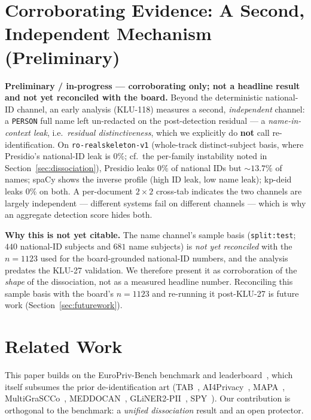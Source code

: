 \documentclass[11pt]{article}
\begin{document}
\section{Corroborating Evidence: A Second, Independent Mechanism (Preliminary)}
\label{sec:corroborating}
\textbf{Preliminary / in-progress --- corroborating only; not a headline result and not yet
reconciled with the board.} Beyond the deterministic national-ID channel, an early analysis (KLU-118)
measures a second, \emph{independent} channel: a \texttt{PERSON} full name left un-redacted on the
post-detection residual --- a \emph{name-in-context leak}, i.e.\ \emph{residual distinctiveness}, which
we explicitly do \textbf{not} call re-identification. On \texttt{ro-realskeleton-v1} (whole-track distinct-subject basis, where Presidio's
national-ID leak is $0\%$; cf.\ the per-family instability noted in
Section~\ref{sec:dissociation}), Presidio leaks
$0\%$ of national IDs but $\sim\!13.7\%$ of names; spaCy shows the inverse profile (high ID leak,
low name leak); kp-deid leaks $0\%$ on both. A per-document $2\times2$ cross-tab indicates the two
channels are largely independent --- different systems fail on different channels --- which is why an
aggregate detection score hides both.

\textbf{Why this is not yet citable.} The name channel's sample basis (\texttt{split:test};
$440$ national-ID subjects and $681$ name subjects) is \emph{not yet reconciled} with the
$n{=}1123$ used for the board-grounded national-ID numbers, and the analysis predates the KLU-27
validation. We therefore present it as corroboration of the \emph{shape} of the dissociation, not as
a measured headline number. Reconciling this sample basis with the board's $n{=}1123$ and re-running
it post-KLU-27 is future work (Section~\ref{sec:futurework}).

\section{Related Work}
\label{sec:related}
This paper builds on the EuroPriv-Bench benchmark and leaderboard~\cite{europrivbench2026}, which
itself subsumes the prior de-identification art (TAB~\cite{pilan2022tab},
AI4Privacy~\cite{ai4privacy_openpii}, MAPA~\cite{mapa_toolkit},
MultiGraSCCo~\cite{multigrascco2026}, MEDDOCAN~\cite{meddocan2019},
GLiNER2-PII~\cite{gliner2pii2026}, SPY~\cite{spy2025}). Our contribution is orthogonal to the
benchmark: a \emph{unified dissociation} result and an open protector.
\end{document}
